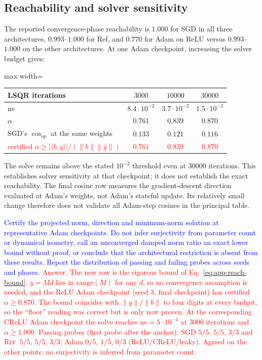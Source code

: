 \documentclass{article}
\newcommand{\zied}[1]{\textcolor{blue}{#1}}
\newcommand{\nat}[1]{\textcolor{red}{#1}}
\newcommand{\TOU}{\textsc{Ref}}
\theoremstyle{definition}
\theoremstyle{remark}
\begin{document}
\subsection{Reachability and solver sensitivity}\label{app:e3}

The reported convergence-phase reachability is $1.000$ for SGD in all three architectures, $0.993$--$1.000$ for Ref, and $0.770$ for Adam on ReLU versus $0.993$--$1.000$ on the other architectures. At one Adam checkpoint, increasing the solver budget gives:

\begin{center}\small
\begin{adjustbox}{max width=\linewidth}
\begin{tabular}{lccc}
\toprule
LSQR iterations & $3000$ & $10000$ & $30000$ \\
\midrule
$\mathrm{ne}$ & $8.4\cdot10^{-2}$ & $3.7\cdot10^{-2}$ & $1.5\cdot10^{-2}$ \\
$\alpha$      & $0.761$ & $0.839$ & $0.870$ \\
SGD's $\cos_{op}$ at the same weights & $0.133$ & $0.121$ & $0.116$ \\
\nat{certified $\alpha\ge|\langle b,y\rangle|/(\|b\|\|y\|)$} & \nat{$0.761$} & \nat{$0.839$} & \nat{$0.870$} \\
\bottomrule
\end{tabular}
\end{adjustbox}
\end{center}

The solve remains above the stated $10^{-2}$ threshold even at $30000$ iterations. This establishes solver sensitivity at that checkpoint; it does not establish the exact reachability. The final cosine row measures the gradient-descent direction evaluated at Adam's weights, not Adam's stateful update. Its relatively small change therefore does not validate all Adam-step cosines in the principal table.

\zied{Certify the projected norm, direction and minimum-norm solution at representative Adam checkpoints. Do not infer surjectivity from parameter count or dynamical isometry, call an unconverged damped norm ratio an exact lower bound without proof, or conclude that the architectural restriction is absent from these results. Report the distribution of passing and failing probes across seeds and phases.}
\nat{Answer. The new row is the rigorous bound of Eq.~\eqref{eq:app-reach-bound}: $y=Md$ lies in $\mathrm{range}(M)$ for any $d$, so no convergence assumption is needed, and the ReLU Adam checkpoint (seed $3$, final checkpoint) has certified $\alpha\ge0.870$. The bound coincides with $\|y\|/\|b\|$ to four digits at every budget, so the ``floor'' reading was correct but is only now proven. At the corresponding CReLU Adam checkpoint the solve reaches $\mathrm{ne}=5\cdot10^{-4}$ at $3000$ iterations and $\alpha\ge1.000$. Passing probes (first probe after the anchor): SGD $5/5$, $5/5$, $3/3$ and \TOU\ $5/5$, $5/5$, $3/3$; Adam $0/5$, $1/5$, $0/3$ (ReLU/CReLU/leaky). Agreed on the other points: no surjectivity is inferred from parameter count.}
\end{document}
